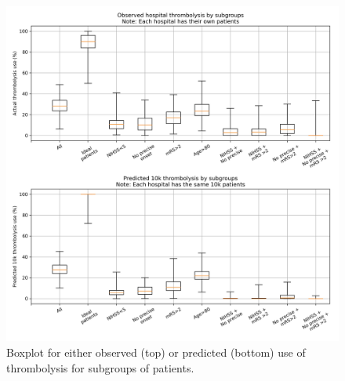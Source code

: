 \begin{figure}
\centering
\includegraphics[width=1\textwidth]{./images/15a_actual_vs_modelled_subgroup_violin}
\caption{Boxplot for either observed (top) or predicted (bottom) use of thrombolysis for subgroups of patients.}
\end{figure}














